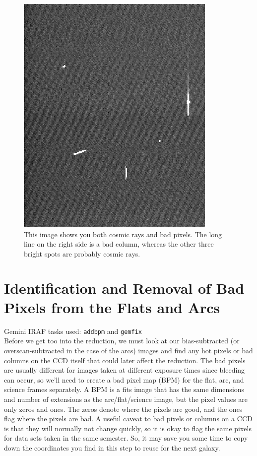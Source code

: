 \documentclass[12pt]{report}
\begin{document}
\begin{figure}[h]
\centering
\includegraphics[scale=0.8]{CRvsBP.jpeg}
\caption[Cosmic Rays vs. Bad Pixels]{This image shows you both cosmic rays and bad pixels. The long line on the right side is a bad column, whereas the other three bright spots are probably cosmic rays.}
\label{fig:badpix}
\end{figure}

\section{Identification and Removal of Bad Pixels from the Flats and Arcs}
\label{badpix}

\noindent Gemini IRAF tasks used: \texttt{addbpm} and \texttt{gemfix}\\

\noindent Before we get too into the reduction, we must look at our bias-subtracted (or overscan-subtracted in the case of the arcs) images and find any hot pixels or bad columns on the CCD itself that could later affect the reduction. The bad pixels are usually  different for images taken at different exposure times since bleeding can occur, so we'll need to create a bad pixel map (BPM) for the flat, arc, and science frames separately. A BPM is a fits image that has the same dimensions and number of extensions as the arc/flat/science image, but the pixel values are only zeros and ones. The zeros denote where the pixels are good, and the ones flag where the pixels are bad. A useful caveat to bad pixels or columns on a CCD is that they will normally not change quickly, so it is okay to flag the same pixels for data sets taken in the same semester. So, it may save you some time to copy down the coordinates you find in this step to reuse for the next galaxy.
\end{document}
